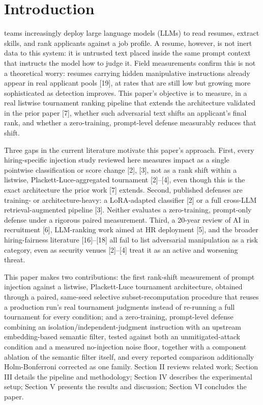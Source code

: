 \documentclass[journal]{IEEEtran}
\begin{document}
\IEEEpeerreviewmaketitle

\section{Introduction}
 teams increasingly deploy large language models (LLMs) to read resumes, extract skills, and rank applicants against a job profile. A resume, however, is not inert data to this system: it is untrusted text placed inside the same prompt context that instructs the model how to judge it. Field measurements confirm this is not a theoretical worry: resumes carrying hidden manipulative instructions already appear in real applicant pools [19], at rates that are still low but growing more sophisticated as detection improves. This paper's objective is to measure, in a real listwise tournament ranking pipeline that extends the architecture validated in the prior paper [7], whether such adversarial text shifts an applicant's final rank, and whether a zero-training, prompt-level defense measurably reduces that shift.

Three gaps in the current literature motivate this paper's approach. First, every hiring-specific injection study reviewed here measures impact as a single pointwise classification or score change [2], [3], not as a rank shift within a listwise, Plackett-Luce-aggregated tournament [2]--[4], even though this is the exact architecture the prior work [7] extends. Second, published defenses are training- or architecture-heavy: a LoRA-adapted classifier [2] or a full cross-LLM retrieval-augmented pipeline [3]. Neither evaluates a zero-training, prompt-only defense under a rigorous paired measurement. Third, a 20-year review of AI in recruitment [6], LLM-ranking work aimed at HR deployment [5], and the broader hiring-fairness literature [16]--[18] all fail to list adversarial manipulation as a risk category, even as security venues [2]--[4] treat it as an active and worsening threat.

This paper makes two contributions: the first rank-shift measurement of prompt injection against a listwise, Plackett-Luce tournament architecture, obtained through a paired, same-seed selective subset-recomputation procedure that reuses a production run's real tournament judgments instead of re-running a full tournament for every condition; and a zero-training, prompt-level defense combining an isolation/independent-judgment instruction with an upstream embedding-based semantic filter, tested against both an unmitigated-attack condition and a measured no-injection noise floor, together with a component ablation of the semantic filter itself, and every reported comparison additionally Holm-Bonferroni corrected as one family. Section II reviews related work; Section III details the pipeline and methodology; Section IV describes the experimental setup; Section V presents the results and discussion; Section VI concludes the paper.
\end{document}
